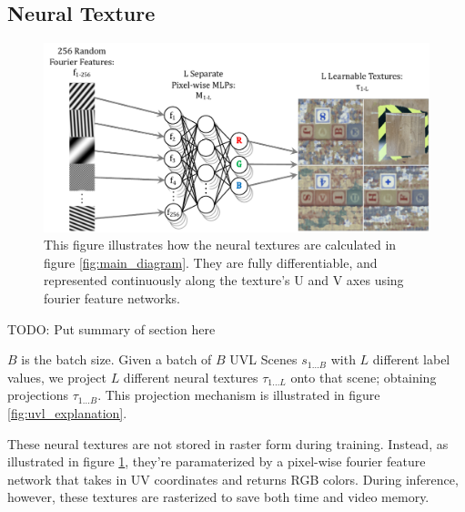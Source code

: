 \documentclass{article}
\begin{document}
\subsection{Neural Texture}

	\begin{figure}[H]
		\begin{center}
			\includegraphics[width=400pt]{../images/learnable_textures.pdf}
		\end{center}
		\caption{
			This figure illustrates how the neural textures are calculated in figure \ref{fig:main_diagram}. They are fully differentiable, and represented continuously along the texture's U and V axes using fourier feature networks.
		}
		\label{fig:learnable_textures}
	\end{figure}

	TODO: Put summary of section here

	$B$ is the batch size. Given a batch of $B$ UVL Scenes $s_{1\dots B}$ with $L$ different label values, we project $L$ different neural textures $\tau_{1\dots L}$ onto that scene; obtaining projections $\tau_{1\dots B}$. This projection mechanism is illustrated in figure \ref{fig:uvl_explanation}.

	These neural textures are not stored in raster form during training. Instead, as illustrated in figure \ref{fig:learnable_textures}, they're paramaterized by a pixel-wise fourier feature network \cite{fourier_feature_networks} that takes in UV coordinates and returns RGB colors. During inference, however, these textures are rasterized to save both time and video memory.
	
\end{document}
